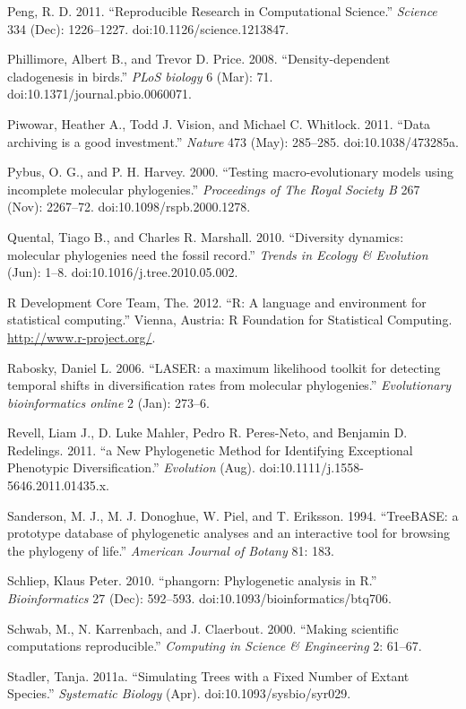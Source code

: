 \documentclass[author-year, 8pt, 3p]{elsarticle} %
\begin{document}
Peng, R. D. 2011. ``Reproducible Research in Computational Science.''
\emph{Science} 334 (Dec): 1226--1227. doi:10.1126/science.1213847.

Phillimore, Albert B., and Trevor D. Price. 2008. ``Density-dependent
cladogenesis in birds.'' \emph{PLoS biology} 6 (Mar): 71.
doi:10.1371/journal.pbio.0060071.

Piwowar, Heather A., Todd J. Vision, and Michael C. Whitlock. 2011.
``Data archiving is a good investment.'' \emph{Nature} 473 (May):
285--285. doi:10.1038/473285a.

Pybus, O. G., and P. H. Harvey. 2000. ``Testing macro-evolutionary
models using incomplete molecular phylogenies.'' \emph{Proceedings of
The Royal Society B} 267 (Nov): 2267--72. doi:10.1098/rspb.2000.1278.

Quental, Tiago B., and Charles R. Marshall. 2010. ``Diversity dynamics:
molecular phylogenies need the fossil record.'' \emph{Trends in Ecology
\& Evolution} (Jun): 1--8. doi:10.1016/j.tree.2010.05.002.

R Development Core Team, The. 2012. ``R: A language and environment for
statistical computing.'' Vienna, Austria: R Foundation for Statistical
Computing. \href{http://www.r-project.org/}{http://www.r-project.org/}.

Rabosky, Daniel L. 2006. ``LASER: a maximum likelihood toolkit for
detecting temporal shifts in diversification rates from molecular
phylogenies.'' \emph{Evolutionary bioinformatics online} 2 (Jan):
273--6.

Revell, Liam J., D. Luke Mahler, Pedro R. Peres-Neto, and Benjamin D.
Redelings. 2011. ``a New Phylogenetic Method for Identifying Exceptional
Phenotypic Diversification.'' \emph{Evolution} (Aug).
doi:10.1111/j.1558-5646.2011.01435.x.

Sanderson, M. J., M. J. Donoghue, W. Piel, and T. Eriksson. 1994.
``TreeBASE: a prototype database of phylogenetic analyses and an
interactive tool for browsing the phylogeny of life.'' \emph{American
Journal of Botany} 81: 183.

Schliep, Klaus Peter. 2010. ``phangorn: Phylogenetic analysis in R.''
\emph{Bioinformatics} 27 (Dec): 592--593.
doi:10.1093/bioinformatics/btq706.

Schwab, M., N. Karrenbach, and J. Claerbout. 2000. ``Making scientific
computations reproducible.'' \emph{Computing in Science \& Engineering}
2: 61--67.

Stadler, Tanja. 2011a. ``Simulating Trees with a Fixed Number of Extant
Species.'' \emph{Systematic Biology} (Apr). doi:10.1093/sysbio/syr029.
\end{document}
